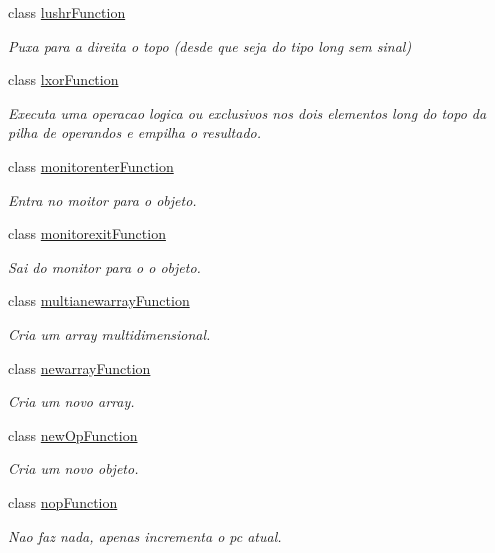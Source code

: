 \begin{DoxyCompactItemize}
class \hyperlink{classInstruction_1_1lushrFunction}{lushr\+Function}
\begin{DoxyCompactList}\small\item\em Puxa para a direita o topo (desde que seja do tipo long sem sinal) \end{DoxyCompactList}\item 
class \hyperlink{classInstruction_1_1lxorFunction}{lxor\+Function}
\begin{DoxyCompactList}\small\item\em Executa uma operacao logica \textquotesingle{}ou exclusivos\textquotesingle{} nos dois elementos long do topo da pilha de operandos e empilha o resultado. \end{DoxyCompactList}\item 
class \hyperlink{classInstruction_1_1monitorenterFunction}{monitorenter\+Function}
\begin{DoxyCompactList}\small\item\em Entra no moitor para o objeto. \end{DoxyCompactList}\item 
class \hyperlink{classInstruction_1_1monitorexitFunction}{monitorexit\+Function}
\begin{DoxyCompactList}\small\item\em Sai do monitor para o o objeto. \end{DoxyCompactList}\item 
class \hyperlink{classInstruction_1_1multianewarrayFunction}{multianewarray\+Function}
\begin{DoxyCompactList}\small\item\em Cria um array multidimensional. \end{DoxyCompactList}\item 
class \hyperlink{classInstruction_1_1newarrayFunction}{newarray\+Function}
\begin{DoxyCompactList}\small\item\em Cria um novo array. \end{DoxyCompactList}\item 
class \hyperlink{classInstruction_1_1newOpFunction}{new\+Op\+Function}
\begin{DoxyCompactList}\small\item\em Cria um novo objeto. \end{DoxyCompactList}\item 
class \hyperlink{classInstruction_1_1nopFunction}{nop\+Function}
\begin{DoxyCompactList}\small\item\em Nao faz nada, apenas incrementa o pc atual. \end{DoxyCompactList}\item 

\end{DoxyCompactItemize}
